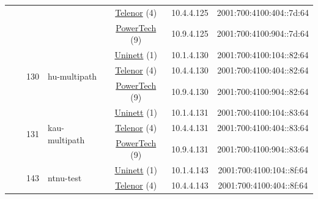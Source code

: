 \begin{small}
\begin{center}
\begin{longtable}{|c|c|c|c|c|c|c|c|}
  &  &  &  & \multicolumn{2}{|c|}{\tiny{\href{https://www.telenor.no}{Telenor} (4)}} & \tiny{10.4.4.125} & \tiny{2001:700:4100:404::7d:64} \\* \cline{5-5}\cline{6-6}\cline{7-7}\cline{8-8}
  &  &  &  & \multicolumn{2}{|c|}{\tiny{\href{http://www.powertech.no}{PowerTech} (9)}} & \tiny{10.9.4.125} & \tiny{2001:700:4100:904::7d:64} \\* \cline{3-3}\cline{4-4}\cline{5-5}\cline{6-6}\cline{7-7}\cline{8-8}
  &  & \multirow{3}{*}{\tiny{130}} & \multicolumn{1}{|l|}{\multirow{3}{*}{\tiny{hu-multipath}}} & \multicolumn{2}{|c|}{\tiny{\href{https://www.uninett.no}{Uninett} (1)}} & \tiny{10.1.4.130} & \tiny{2001:700:4100:104::82:64} \\* \cline{5-5}\cline{6-6}\cline{7-7}\cline{8-8}
  &  &  &  & \multicolumn{2}{|c|}{\tiny{\href{https://www.telenor.no}{Telenor} (4)}} & \tiny{10.4.4.130} & \tiny{2001:700:4100:404::82:64} \\* \cline{5-5}\cline{6-6}\cline{7-7}\cline{8-8}
  &  &  &  & \multicolumn{2}{|c|}{\tiny{\href{http://www.powertech.no}{PowerTech} (9)}} & \tiny{10.9.4.130} & \tiny{2001:700:4100:904::82:64} \\* \cline{3-3}\cline{4-4}\cline{5-5}\cline{6-6}\cline{7-7}\cline{8-8}
  &  & \multirow{3}{*}{\tiny{131}} & \multicolumn{1}{|l|}{\multirow{3}{*}{\tiny{kau-multipath}}} & \multicolumn{2}{|c|}{\tiny{\href{https://www.uninett.no}{Uninett} (1)}} & \tiny{10.1.4.131} & \tiny{2001:700:4100:104::83:64} \\* \cline{5-5}\cline{6-6}\cline{7-7}\cline{8-8}
  &  &  &  & \multicolumn{2}{|c|}{\tiny{\href{https://www.telenor.no}{Telenor} (4)}} & \tiny{10.4.4.131} & \tiny{2001:700:4100:404::83:64} \\* \cline{5-5}\cline{6-6}\cline{7-7}\cline{8-8}
  &  &  &  & \multicolumn{2}{|c|}{\tiny{\href{http://www.powertech.no}{PowerTech} (9)}} & \tiny{10.9.4.131} & \tiny{2001:700:4100:904::83:64} \\* \cline{3-3}\cline{4-4}\cline{5-5}\cline{6-6}\cline{7-7}\cline{8-8}
  &  & \multirow{3}{*}{\tiny{143}} & \multicolumn{1}{|l|}{\multirow{3}{*}{\tiny{ntnu-test}}} & \multicolumn{2}{|c|}{\tiny{\href{https://www.uninett.no}{Uninett} (1)}} & \tiny{10.1.4.143} & \tiny{2001:700:4100:104::8f:64} \\* \cline{5-5}\cline{6-6}\cline{7-7}\cline{8-8}
  &  &  &  & \multicolumn{2}{|c|}{\tiny{\href{https://www.telenor.no}{Telenor} (4)}} & \tiny{10.4.4.143} & \tiny{2001:700:4100:404::8f:64} \\* \cline{5-5}\cline{6-6}\cline{7-7}\cline{8-8}

\end{longtable}
\end{center}
\end{small}
